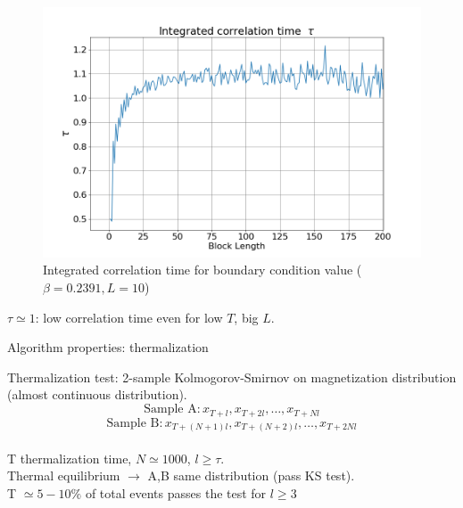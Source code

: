 \documentclass[12pt,handout]{beamer}
\begin{document}
\begin{frame}
\begin{center}
\begin{figure}
\centering
\includegraphics[scale=0.35]{correlation.png}
\caption{Integrated correlation time for boundary condition value ($\beta = 0.2391, L = 10$)\label{fig:corr}}
\end{figure}
$\tau \simeq 1$: low correlation time even for low $T$, big $L$.
\end{center}
\end{frame}

\begin{frame}{Algorithm properties: thermalization}
\begin{center}
Thermalization test: 2-sample Kolmogorov-Smirnov on magnetization distribution (almost continuous distribution).
\[
	\mbox{Sample A}: x_{T+l}, x_{T+2l},\ldots, x_{T+Nl}
\]
\[
	\mbox{Sample B}: x_{T+(N+1)l}, x_{T+(N+2)l}, \ldots, x_{T+2Nl}
\]\\
\vspace{10pt}
T thermalization time, $N \simeq 1000$, $l\ge \tau$.\\
\vspace{10pt}
Thermal equilibrium $\rightarrow$ A,B same distribution (pass KS test).\\
\vspace{10pt}
T $\simeq 5-10\%$ of total events passes the test for $l \ge 3$
\end{center}
\end{frame}
\end{document}
